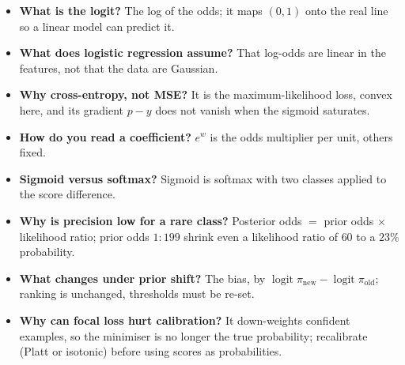 \documentclass[11pt,a4paper]{article}
\DeclareMathOperator{\logit}{logit}
\theoremstyle{definition}
\begin{document}
\begin{itemize}
\item \textbf{What is the logit?} The log of the odds; it maps $(0,1)$ onto the real line so a linear model can predict it.
\item \textbf{What does logistic regression assume?} That log-odds are linear in the features, not that the data are Gaussian.
\item \textbf{Why cross-entropy, not MSE?} It is the maximum-likelihood loss, convex here, and its gradient $p-y$ does not vanish when the sigmoid saturates.
\item \textbf{How do you read a coefficient?} $e^{w}$ is the odds multiplier per unit, others fixed.
\item \textbf{Sigmoid versus softmax?} Sigmoid is softmax with two classes applied to the score difference.
\item \textbf{Why is precision low for a rare class?} Posterior odds $=$ prior odds $\times$ likelihood ratio; prior odds $1:199$ shrink even a likelihood ratio of $60$ to a $23\%$ probability.
\item \textbf{What changes under prior shift?} The bias, by $\logit\pi_{\text{new}}-\logit\pi_{\text{old}}$; ranking is unchanged, thresholds must be re-set.
\item \textbf{Why can focal loss hurt calibration?} It down-weights confident examples, so the minimiser is no longer the true probability; recalibrate (Platt or isotonic) before using scores as probabilities.
\end{itemize}
\end{document}
